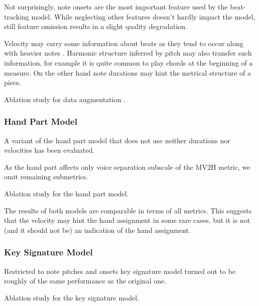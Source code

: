 Not surprisingly, note onsets are the most important feature used by the beat-tracking model. While neglecting other features doesn't hardly impact the model, still feature omission results in a slight quality degradation.

Velocity may carry some information about beats as they tend to occur along with heavier notes \cite{Liu2022}. Harmonic structure inferred by pitch may also transfer such information, for example it is quite common to play chords at the beginning of a measure. On the other hand note durations may hint the metrical structure of a piece.

\begin{table}[ht!]
\centering

\caption[Ablation study for data augmentation.]{Ablation study for data augmentation \cite{Liu2022}.}
\label{beat_tracking_data_augmentation}
\end{table}

\subsubsection{Hand Part Model}

A variant of the hand part model that does not use neither durations nor velocities has been evaluated.

As the hand part affects only voice separation subscale of the MV2H metric, we omit remaining submetrics.

\begin{table}[ht!]
\centering

\caption[Ablation study for the hand part model.]{Ablation study for the hand part model.}
\label{hand_part_ablation}
\end{table}

The results of both models are comparable in terms of all metrics. This suggests that the velocity may hint the hand assignment in some rare cases, but it is not (and it should not be) an indication of the hand assignment. 

\subsubsection{Key Signature Model}

Restricted to note pitches and onsets key signature model turned out to be roughly of the same performance as the original one. 

\begin{table}[ht!]
\centering

\caption[Ablation study for the key signature model.]{Ablation study for the key signature model.}
\label{key_signature_ablation}
\end{table}

